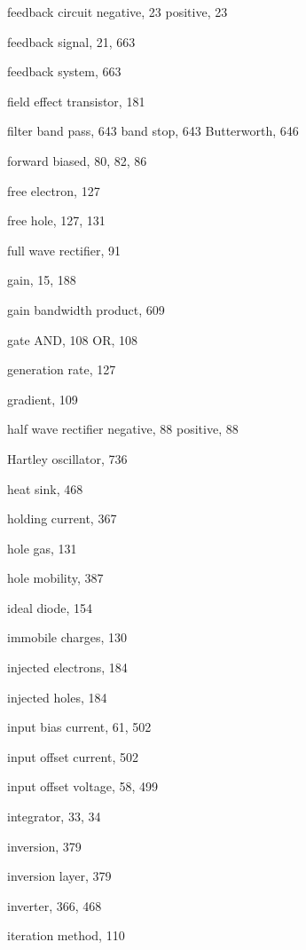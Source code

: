 \begin{theindex}
\begin{otherlanguage}{english}
  \indexspace

  \item feedback circuit
    \subitem negative, 23
    \subitem positive, 23
  \item feedback signal, 21, 663
  \item feedback system, 663
  \item field effect transistor, 181
  \item filter
    \subitem band pass, 643
    \subitem band stop, 643
    \subitem Butterworth, 646
  \item forward biased, 80, 82, 86
  \item free electron, 127
  \item free hole, 127, 131
  \item full wave rectifier, 91

  \indexspace

  \item gain, 15, 188
  \item gain bandwidth product, 609
  \item gate
    \subitem AND, 108
    \subitem OR, 108
  \item generation rate, 127
  \item gradient, 109

  \indexspace

  \item half wave rectifier
    \subitem negative, 88
    \subitem positive, 88
  \item Hartley oscillator, 736
  \item heat sink, 468
  \item holding current, 367
  \item hole gas, 131
  \item hole mobility, 387

  \indexspace

  \item ideal diode, 154
  \item immobile
    \subitem charges, 130
  \item injected electrons, 184
  \item injected holes, 184
  \item input bias current, 61, 502
  \item input offset current, 502
  \item input offset voltage, 58, 499
  \item integrator, 33, 34
  \item inversion, 379
  \item inversion layer, 379
  \item inverter, 366, 468
  \item iteration method, 110


\end{otherlanguage}
\end{theindex}
